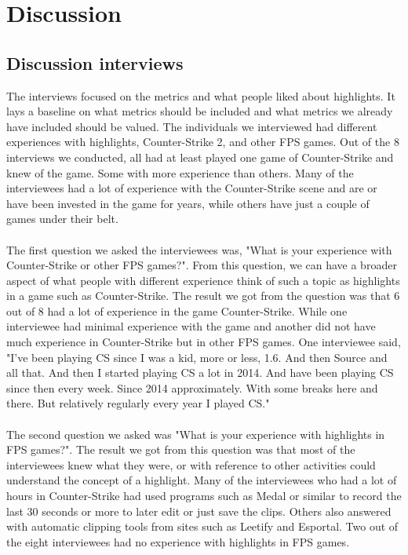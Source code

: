 
\chapter{Discussion}
\label{chp:discussion}
\section{Discussion interviews}
The interviews focused on the metrics and what people liked about highlights. It lays a baseline on what metrics should be included and what metrics we already have included should be valued. The individuals we interviewed had different experiences with highlights, Counter-Strike 2, and other FPS games. Out of the 8 interviews we conducted, all had at least played one game of Counter-Strike and knew of the game. Some with more experience than others. Many of the interviewees had a lot of experience with the Counter-Strike scene and are or have been invested in the game for years, while others have just a couple of games under their belt.\\\\
The first question we asked the interviewees was, "What is your experience with Counter-Strike or other FPS games?". From this question, we can have a broader aspect of what people with different experience think of such a topic as highlights in a game such as Counter-Strike. The result we got from the question was that 6 out of 8 had a lot of experience in the game Counter-Strike. While one interviewee had minimal experience with the game and another did not have much experience in Counter-Strike but in other FPS games. One interviewee said, "I've been playing CS since I was a kid, more or less, 1.6. And then Source and all that. And then I started playing CS a lot in 2014. And have been playing CS since then every week. Since 2014 approximately. With some breaks here and there. But relatively regularly every year I played CS."\\\\
The second question we asked was "What is your experience with highlights in FPS games?". The result we got from this question was that most of the interviewees knew what they were, or with reference to other activities could understand the concept of a highlight. Many of the interviewees who had a lot of hours in Counter-Strike had used programs such as Medal or similar to record the last 30 seconds or more to later edit or just save the clips. Others also answered with automatic clipping tools from sites such as Leetify and Esportal. Two out of the eight interviewees had no experience with highlights in FPS games.\\\\
